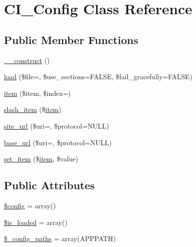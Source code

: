 \hypertarget{class_c_i___config}{}\section{C\+I\+\_\+\+Config Class Reference}
\label{class_c_i___config}
\subsection*{Public Member Functions}
\begin{DoxyCompactItemize}
\item 
\mbox{\hyperlink{class_c_i___config_a095c5d389db211932136b53f25f39685}{\+\_\+\+\_\+construct}} ()
\item 
\mbox{\hyperlink{class_c_i___config_a057a1ef8c730d6e00e3eeccbafe46f0d}{load}} (\$file=\textquotesingle{}\textquotesingle{}, \$use\+\_\+sections=F\+A\+L\+SE, \$fail\+\_\+gracefully=F\+A\+L\+SE)
\item 
\mbox{\hyperlink{class_c_i___config_a5fcaaca1b4d8a9d4c96311ce97d398c0}{item}} (\$item, \$index=\textquotesingle{}\textquotesingle{})
\item 
\mbox{\hyperlink{class_c_i___config_abead21ebddc51d12402b5320d531eb1f}{slash\+\_\+item}} (\$\mbox{\hyperlink{class_c_i___config_a5fcaaca1b4d8a9d4c96311ce97d398c0}{item}})
\item 
\mbox{\hyperlink{class_c_i___config_a3a12687251c502cb2d9c1e3f77ca56b8}{site\+\_\+url}} (\$uri=\textquotesingle{}\textquotesingle{}, \$protocol=N\+U\+LL)
\item 
\mbox{\hyperlink{class_c_i___config_a209120be5e55785e74609097123b40cf}{base\+\_\+url}} (\$uri=\textquotesingle{}\textquotesingle{}, \$protocol=N\+U\+LL)
\item 
\mbox{\hyperlink{class_c_i___config_a3cbd3bcacb546d42f5dd12213df48627}{set\+\_\+item}} (\$\mbox{\hyperlink{class_c_i___config_a5fcaaca1b4d8a9d4c96311ce97d398c0}{item}}, \$value)
\end{DoxyCompactItemize}
\subsection*{Public Attributes}
\begin{DoxyCompactItemize}
\item 
\mbox{\hyperlink{class_c_i___config_a49c7011be9c979d9174c52a8b83e5d8e}{\$config}} = array()
\item 
\mbox{\hyperlink{class_c_i___config_a908e9ad52a5d1956d360689452f6bdbe}{\$is\+\_\+loaded}} = array()
\item 
\mbox{\hyperlink{class_c_i___config_a5f47dbd2111b5bb6c91ece69fefebf26}{\$\+\_\+config\+\_\+paths}} = array(A\+P\+P\+P\+A\+TH)
\end{DoxyCompactItemize}
